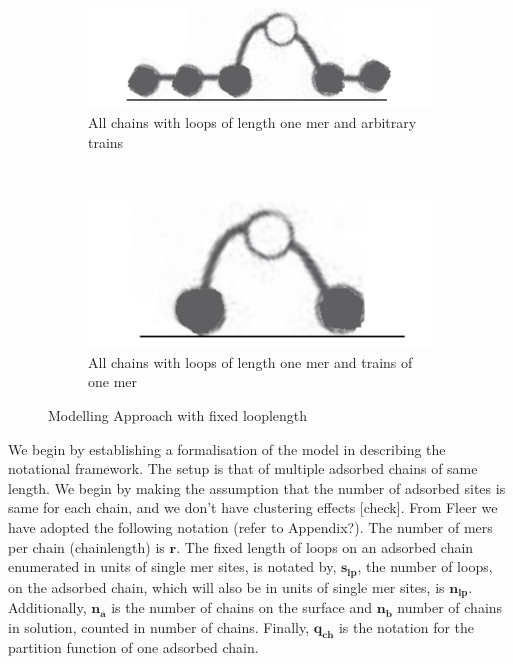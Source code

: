 \documentclass[10pt,letterpaper]{article}
\begin{document}
\begin{figure}[H]
	\centering
	\begin{subfigure}[b]{0.3\textwidth}
		\centering
		\includegraphics[scale=0.2]{loop1_trains.png}
		\caption{All chains with loops of length one mer and arbitrary trains}
		\label{loop and train}
	\end{subfigure}~~~~~~~~~~~~
	\begin{subfigure}[b]{0.3\textwidth}
		\centering
		\includegraphics[scale=0.2]{loop1.png}
		\caption{All chains with loops of length one mer and trains of one mer}
		\label{loop}
	\end{subfigure}
	\caption{Modelling Approach with fixed looplength}
\end{figure}



\noindent We begin by establishing a formalisation of the model in describing the notational framework. The setup is that of multiple adsorbed chains of same length. We begin by making the assumption that the number of adsorbed sites is same for each chain, and we don't have clustering effects [check]. From Fleer \cite{fleer1993polymers} we have adopted the following notation (refer to Appendix?). The number of mers per chain (chainlength) is $\mathbf{r}$. The fixed length of loops on an adsorbed chain enumerated in units of single mer sites, is notated by, $\mathbf{s_{lp}}$, the number of loops, on the adsorbed chain, which will also be in units of single mer sites, is $\mathbf{n_{lp}}$. Additionally, $\mathbf{n_a}$  is the number of chains on the surface and $\mathbf{n_b}$ number of chains in solution, counted in number of chains. Finally, $\mathbf{q_{ch}}$ is the notation for the partition function of one adsorbed chain.\\
\end{document}
